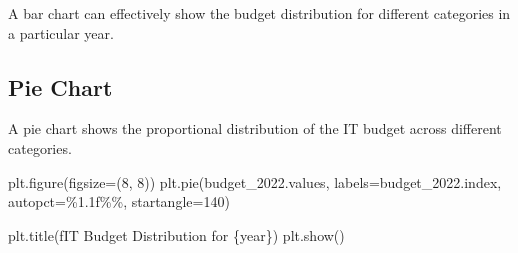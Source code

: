 \documentclass[
  letterpaper,
  DIV=11,
  numbers=noendperiod]{scrreprt}
\newenvironment{Shaded}{\begin{snugshade}}{\end{snugshade}}
\newcommand{\DecValTok}[1]{\textcolor[rgb]{0.68,0.00,0.00}{#1}}
\newcommand{\NormalTok}[1]{\textcolor[rgb]{0.00,0.23,0.31}{#1}}
\newcommand{\OperatorTok}[1]{\textcolor[rgb]{0.37,0.37,0.37}{#1}}
\newcommand{\SpecialCharTok}[1]{\textcolor[rgb]{0.37,0.37,0.37}{#1}}
\newcommand{\SpecialStringTok}[1]{\textcolor[rgb]{0.13,0.47,0.30}{#1}}
\newcommand{\StringTok}[1]{\textcolor[rgb]{0.13,0.47,0.30}{#1}}
\begin{document}
A bar chart can effectively show the budget distribution for different
categories in a particular year.

\begin{Shaded}
\end{Shaded}

\subsection{Pie Chart}\label{pie-chart}

A pie chart shows the proportional distribution of the IT budget across
different categories.

\begin{Shaded}
\begin{Highlighting}[]
\NormalTok{plt.figure(figsize}\OperatorTok{=}\NormalTok{(}\DecValTok{8}\NormalTok{, }\DecValTok{8}\NormalTok{))}
\NormalTok{plt.pie(budget\_2022.values, labels}\OperatorTok{=}\NormalTok{budget\_2022.index, autopct}\OperatorTok{=}\StringTok{\textquotesingle{}}\SpecialCharTok{\%1.1f\%\%}\StringTok{\textquotesingle{}}\NormalTok{, startangle}\OperatorTok{=}\DecValTok{140}\NormalTok{)}

\NormalTok{plt.title(}\SpecialStringTok{f\textquotesingle{}IT Budget Distribution for }\SpecialCharTok{\{}\NormalTok{year}\SpecialCharTok{\}}\SpecialStringTok{\textquotesingle{}}\NormalTok{)}
\NormalTok{plt.show()}
\end{Highlighting}
\end{Shaded}
\end{document}
